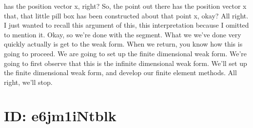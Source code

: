 \documentclass[10pt]{article}
\begin{document}
has the position vector x, right? So, the point out there has the position vector x that, that little pill box has been constructed about that point x, okay? All right. I just wanted to recall this argument of this, this interpretation because I omitted to mention it. Okay, so we're done with the segment. What we we've done very quickly actually is get to the weak form. When we return, you know how this is going to proceed. We are going to set up the finite dimensional weak form. We're going to first observe that this is the infinite dimensional weak form. We'll set up the finite dimensional weak form, and develop our finite element methods. All right, we'll stop.

\section*{ID: e6jm1iNtblk}
\end{document}
